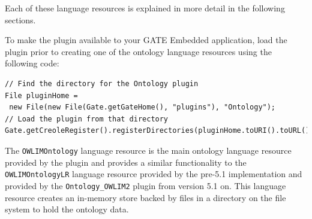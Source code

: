 Each of these language resources is explained in more detail in the following sections.

To make the plugin available to your GATE Embedded application, load the plugin
prior to creating one of the ontology language resources using the following 
code:
\begin{lstlisting}
// Find the directory for the Ontology plugin
File pluginHome = 
 new File(new File(Gate.getGateHome(), "plugins"), "Ontology");
// Load the plugin from that directory
Gate.getCreoleRegister().registerDirectories(pluginHome.toURI().toURL());
\end{lstlisting}


The \verb!OWLIMOntology! language resource is the main ontology language 
resource provided by the plugin and provides a similar functionality
to the \verb!OWLIMOntologyLR! language resource provided by the pre-5.1
implementation and provided by the \verb!Ontology_OWLIM2! plugin from
version 5.1 on. This language resource creates an in-memory store backed
by files in a directory on the file system to hold the ontology
data.

